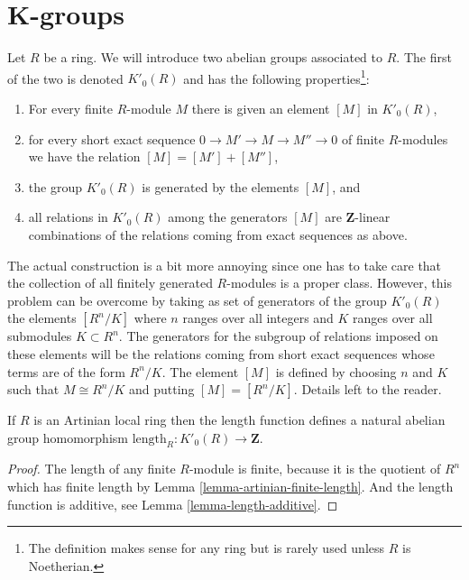 \section{K-groups}
\label{section-K-groups}

\noindent
Let $R$ be a ring. We will introduce two abelian groups associated
to $R$. The first of the two is denoted $K'_0(R)$ and has the following
properties\footnote{The definition makes sense for any ring but is rarely
used unless $R$ is Noetherian.}:
\begin{enumerate}
\item For every finite $R$-module $M$ there is given an element $[M]$ in
$K'_0(R)$,
\item for every short exact sequence $0 \to M' \to M \to M'' \to 0$
of finite $R$-modules we have the relation $[M] = [M'] + [M'']$,
\item the group $K'_0(R)$ is generated by the elements $[M]$, and
\item all relations in $K'_0(R)$ among the generators $[M]$
are $\mathbf{Z}$-linear combinations
of the relations coming from exact sequences as above.
\end{enumerate}
The actual construction is a bit more annoying since one has to take care
that the collection of all finitely generated $R$-modules is a proper class.
However, this problem can be overcome by taking as set of generators
of the group $K'_0(R)$ the elements $[R^n/K]$ where $n$ ranges over
all integers and $K$ ranges over all submodules $K \subset R^n$.
The generators for the subgroup of relations imposed on these elements
will be the relations coming from short exact sequences whose terms
are of the form $R^n/K$. The element $[M]$ is defined by
choosing $n$ and $K$ such that $M \cong R^n/K$ and putting
$[M] = [R^n/K]$. Details left to the reader.

\begin{lemma}
\label{lemma-length-K0}
If $R$ is an Artinian local ring then the length function
defines a natural abelian group homomorphism
$\text{length}_R : K'_0(R) \to \mathbf{Z}$.
\end{lemma}

\begin{proof}
The length of any finite $R$-module is finite,
because it is the quotient of $R^n$ which has finite length by
Lemma \ref{lemma-artinian-finite-length}. And the length function
is additive, see Lemma \ref{lemma-length-additive}.
\end{proof}

